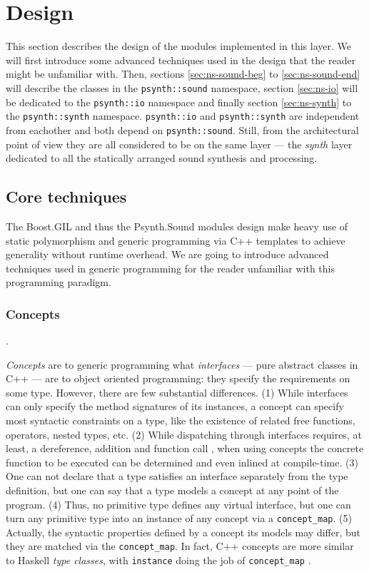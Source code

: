 \section{Design}

This section describes the design of
the modules implemented in this layer. We will first introduce some
advanced techniques used in the design that the reader might be
unfamiliar with. Then, sections \ref{sec:ns-sound-beg} to
\ref{sec:ns-sound-end} will describe the classes in the
\texttt{psynth::sound} namespace, section \ref{sec:ns-io} will be
dedicated to the \texttt{psynth::io} namespace and finally section
\ref{sec:ns-synth} to the \texttt{psynth::synth}
namespace. \texttt{psynth::io} and \texttt{psynth::synth} are
independent from eachother and both depend on
\texttt{psynth::sound}. Still, from the architectural point of view
they are all considered to be on the same layer --- the \emph{synth}
layer dedicated to all the statically arranged sound synthesis and
processing.

\subsection{Core techniques}

The Boost.GIL and thus the Psynth.Sound modules design make heavy use
of static polymorphism and generic
programming via C++ templates to achieve generality without runtime
overhead. We are going to introduce advanced techniques used in
generic programming for the reader unfamiliar with this programming
paradigm.

\subsubsection{Concepts}
\label{sec:concepts}.

\emph{Concepts}
\cite{jarvi10concept} are to generic programming what
\emph{interfaces} --- pure abstract classes in C++ --- are to object
oriented programming: they specify the requirements on some
type. However, there are few substantial differences. (1) While
interfaces can only specify the method signatures of its instances, a
concept can specify most syntactic constraints on a type, like the
existence of related free functions, operators, nested types, etc. (2)
While dispatching through interfaces requires, at least, a
dereference, addition and function call \cite{driesen96direct}, when
using concepts the concrete function to be executed can be determined
and even inlined at compile-time. (3) One can not declare that a type
satisfies an interface separately from the type definition, but one
can say that a type models a concept at any point of the program. (4)
Thus, no primitive type defines any virtual interface, but one can
turn any primitive type into an instance of any concept via a
\texttt{concept\_map}. (5) Actually, the syntactic
properties defined by a concept its models may differ, but they are
matched via the \texttt{concept\_map}. In fact, C++ concepts are more
similar to Haskell \emph{type classes}, with
\texttt{instance} doing the job of \texttt{concept\_map}
\cite{bernardy08comparison}.

